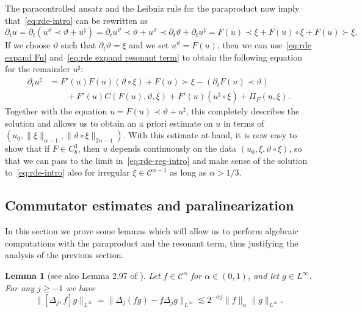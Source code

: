 \documentclass[11pt,a4paper]{article}
\newtheorem{lemma}[theorem]{Lemma}
\theoremstyle{remark}
\newcommand{\CC}{\ensuremath{\mathscr{C}}}
\begin{document}
The paracontrolled ansatz and the Leibniz rule for the paraproduct now imply
that~{\eqref{eq:rde-intro}} can be rewritten as
\[
   \partial_{t} u= \partial_{t} ( u^{\vartheta} \prec \vartheta +u^{\sharp} ) = \partial_{t} u^{\vartheta} \prec \vartheta +u^{\vartheta} \prec \partial_{t} \vartheta + \partial_{t} u^{\sharp} =F ( u ) \prec \xi +F ( u ) \circ   \xi +F ( u ) \succ \xi.
\]
If we choose $\vartheta$ such that $\partial_{t} \vartheta = \xi$ %
and we set $u^{\vartheta} =F ( u )$, then we can
use~{\eqref{eq:rde expand Fu}} and~{\eqref{eq:rde expand resonant term}} to
obtain the following equation for the remainder $u^{\sharp}$:
\begin{align*}%
  \partial_{t} u^{\sharp} & = F' ( u ) F ( u ) (\vartheta \circ \xi ) +F ( u ) \succ \xi - ( \partial_{t} F ( u ) \prec \vartheta ) \\
  &\qquad +F' ( u ) C ( F ( u ) , \vartheta , \xi ) +F' ( u )  ( u^{\sharp} \circ \xi) + \Pi_{F} ( u, \xi ).
\end{align*}
Together with the equation $u=F ( u ) \prec \vartheta +u^{\sharp}$, this completely describes the solution and allows us to obtain an a priori estimate on $u$ in terms of $(u_0, \|\xi\|_{\alpha-1}, \|\vartheta \circ \xi\|_{2\alpha-1})$. With this estimate at hand, it is now easy to show that if $F \in C^3_b$, then $u$ depends continuously on the data $(u_0, \xi, \vartheta \circ \xi)$, so that we can pass to the limit in~\eqref{eq:rde-reg-intro} and make sense of the solution to~\eqref{eq:rde-intro} also for irregular $\xi \in \CC^{\alpha-1}$ as long as $\alpha > 1/3$.


\subsection{Commutator estimates and paralinearization}

In this section we prove some lemmas which will allow us to perform algebraic computations with the paraproduct and the resonant term, thus justifying the analysis of the previous section.

\begin{lemma}[see also Lemma 2.97 of {\cite{Bahouri2011}}]\label{l:bahouri commutator}
  Let $f \in \CC^{\alpha}$ for $\alpha \in ( 0,1 )$, and let $g \in L^{\infty}$. For any $j \geqslant -1$ we have
  \[
     \| [ \Delta_{j} ,f ] g \|_{L^{\infty}} = \| \Delta_{j} ( f g ) -f \Delta_{j} g \|_{L^{\infty}} \lesssim 2^{- \alpha j} \|  f \|_{\alpha} \| g \|_{L^{\infty}} .
  \]
\end{lemma}
\end{document}
